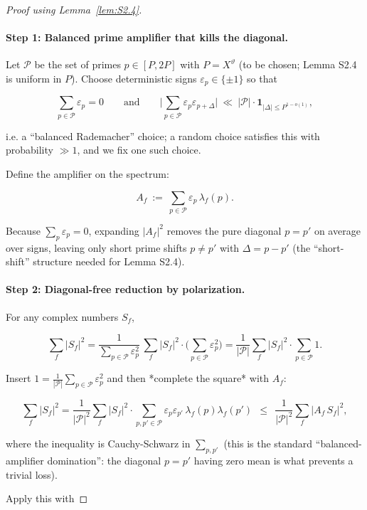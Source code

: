 \documentclass[11pt]{article}
\theoremstyle{definition}
\theoremstyle{remark}
\begin{document}
\begin{proof}[Proof using Lemma~\ref{lem:S2.4}]

\paragraph{Step 1: Balanced prime amplifier that kills the diagonal.}
Let $\mathcal P$ be the set of primes $p\in[P,2P]$ with $P=X^\vartheta$ (to be chosen; Lemma S2.4 is uniform in $P$).
Choose deterministic signs $\varepsilon_p\in\{\pm 1\}$ so that

$$
\sum_{p\in\mathcal P}\varepsilon_p=0
\qquad\text{and}\qquad
\Big|\sum_{p\in\mathcal P}\varepsilon_p\varepsilon_{p+\Delta}\Big|\ \ll\ |\mathcal P|\cdot \mathbf{1}_{|\Delta|\le P^{1-o(1)}},
$$

i.e. a “balanced Rademacher” choice; a random choice satisfies this with probability $\gg 1$, and we fix one such choice.

Define the amplifier on the spectrum:

$$
A_f \ :=\ \sum_{p\in\mathcal P}\varepsilon_p\,\lambda_f(p).
$$

Because $\sum_p\varepsilon_p=0$, expanding $|A_f|^2$ removes the pure diagonal $p=p'$ on average over signs, leaving only short prime shifts $p\neq p'$ with $\Delta = p-p'$ (the “short-shift” structure needed for Lemma S2.4).

\paragraph{Step 2: Diagonal-free reduction by polarization.}
For any complex numbers $S_f$,

$$
\sum_f |S_f|^2
=\frac{1}{\sum_{p\in\mathcal P}\varepsilon_p^2}\,
\sum_f |S_f|^2\cdot \Big(\sum_{p\in\mathcal P}\varepsilon_p^2\Big)
=\frac{1}{|\mathcal P|}\sum_f |S_f|^2\cdot \sum_{p\in\mathcal P}1.
$$

Insert $1=\frac{1}{|\mathcal P|}\sum_{p\in\mathcal P}\varepsilon_p^2$ and then *complete the square* with $A_f$:

$$
\sum_f |S_f|^2
=\frac{1}{|\mathcal P|^2}\sum_f |S_f|^2\cdot \sum_{p,p'\in\mathcal P}\varepsilon_p\varepsilon_{p'}\,\lambda_f(p)\lambda_f(p')
\ \ \le\ \ \frac{1}{|\mathcal P|^2}\sum_f |A_f\,S_f|^2,
$$

where the inequality is Cauchy-Schwarz in $\sum_{p,p'}$ (this is the standard “balanced-amplifier domination”: the diagonal $p=p'$ having zero mean is what prevents a trivial loss).

Apply this with


\end{proof}
\end{document}
